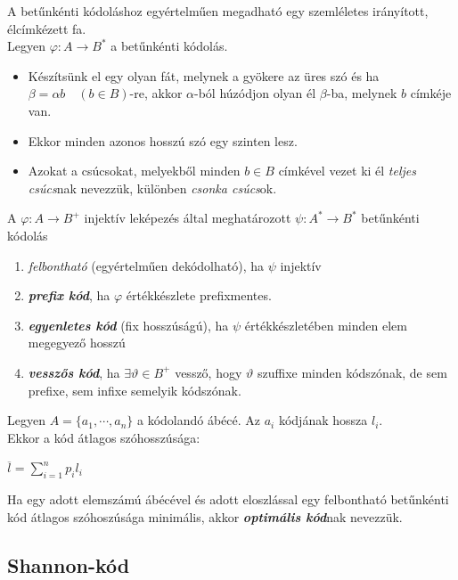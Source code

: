 \documentclass[12pt,margin=0px]{article}
\begin{document}
    \noindent A betűnkénti kódoláshoz egyértelműen megadható egy szemléletes irányított, élcímkézett fa. \\

    \noindent Legyen $\varphi : A \rightarrow B^*$ a betűnkénti kódolás.
    \begin{itemize}[leftmargin=5.5mm]
        \renewcommand{\labelitemi}{$\vcenter{\hbox{\tiny$\bullet$}}$}
        \item Készítsünk el egy olyan fát, melynek a gyökere az üres szó és ha $\beta = \alpha b\quad (b\in B)$-re, akkor $\alpha$-ból húzódjon olyan él $\beta$-ba, melynek $b$ címkéje van.
        \item Ekkor minden azonos hosszú szó egy szinten lesz.
        \item Azokat a csúcsokat, melyekből minden $b\in B$ címkével vezet ki él \emph{teljes csúcs}nak nevezzük, különben \emph{csonka csúcs}ok.
    \end{itemize}

    \noindent A $\varphi : A \rightarrow B^+$ injektív leképezés által meghatározott $\psi : A^* \rightarrow B^*$ betűnkénti kódolás

    \begin{enumerate}
       	\item \emph{felbontható} (egyértelműen dekódolható), ha $\psi$ injektív
       	\item \emph{\textbf{prefix kód}}, ha $\varphi$ értékkészlete prefixmentes.
       	\item \emph{\textbf{egyenletes kód}} (fix hosszúságú), ha $\psi$ értékkészletében minden elem megegyező hosszú
       	\item \emph{\textbf{vesszős kód}}, ha $\exists \vartheta \in B^+$ vessző, hogy $\vartheta$ szuffixe minden kódszónak, de sem prefixe, sem infixe semelyik kódszónak.
    \end{enumerate}

    \noindent Legyen $A = \{a_1,\cdots, a_n\}$ a kódolandó ábécé. Az $a_i$ kódjának hossza $l_i$. \\
    Ekkor a kód átlagos szóhosszúsága:
    \begin{center}
        $\overline{l} = \sum\limits_{i=1}^{n}p_il_i$
    \end{center}

    \noindent Ha egy adott elemszámú ábécével és adott eloszlással egy felbontható betűnkénti kód átlagos szóhoszúsága minimális, akkor \emph{\textbf{optimális kód}}nak nevezzük.
\newpage
    \subsection*{Shannon-kód\\}
\end{document}

